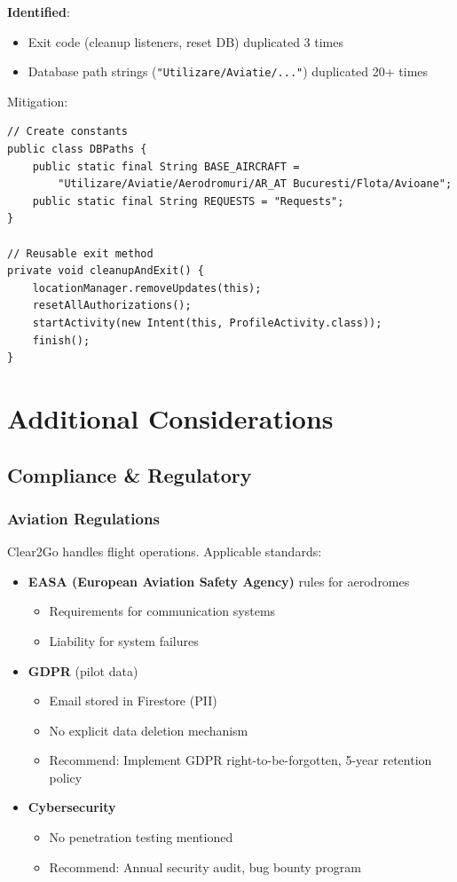 \documentclass[11pt,a4paper]{report}
\begin{document}
\textbf{Identified}:
\begin{itemize}
    \item Exit code (cleanup listeners, reset DB) duplicated 3 times
    \item Database path strings (\texttt{"Utilizare/Aviatie/..."}) duplicated 20+ times
\end{itemize}

Mitigation:
\begin{lstlisting}
// Create constants
public class DBPaths {
    public static final String BASE_AIRCRAFT =
        "Utilizare/Aviatie/Aerodromuri/AR_AT Bucuresti/Flota/Avioane";
    public static final String REQUESTS = "Requests";
}

// Reusable exit method
private void cleanupAndExit() {
    locationManager.removeUpdates(this);
    resetAllAuthorizations();
    startActivity(new Intent(this, ProfileActivity.class));
    finish();
}
\end{lstlisting}

\chapter{Additional Considerations}

\section{Compliance \& Regulatory}

\subsection{Aviation Regulations}

Clear2Go handles flight operations. Applicable standards:

\begin{itemize}
    \item \textbf{EASA (European Aviation Safety Agency)} rules for aerodromes
    \begin{itemize}
        \item Requirements for communication systems
        \item Liability for system failures
    \end{itemize}

    \item \textbf{GDPR} (pilot data)
    \begin{itemize}
        \item Email stored in Firestore (PII)
        \item No explicit data deletion mechanism
        \item Recommend: Implement GDPR right-to-be-forgotten, 5-year retention policy
    \end{itemize}

    \item \textbf{Cybersecurity}
    \begin{itemize}
        \item No penetration testing mentioned
        \item Recommend: Annual security audit, bug bounty program
    \end{itemize}
\end{itemize}
\end{document}
